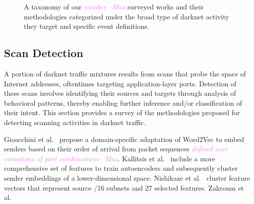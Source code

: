 \documentclass[manuscript,nonacm]{acmart}
\newcommand{\maxnote}[1]{\textit{\textcolor{violet}{#1 --Max}}}
\begin{document}
\begin{figure}
    \caption{A taxonomy of our \maxnote{number} surveyed works and their methodologies categorized under the broad type of darknet activity they target and specific event definitions.}
    \label{fig:taxonomy}
\end{figure}

\subsection{Scan Detection}

A portion of darknet traffic mixtures results from scans that probe the space of Internet addresses, oftentimes targeting application-layer ports.
Detection of these scans involves identifying their sources and targets through analysis of behavioral patterns, thereby enabling further inference and/or classification of their intent.
This section provides a survey of the methodologies proposed for detecting scanning activities in darknet traffic. 

Gioacchini et al.~\cite{2021gioacchini,2023gioacchini} propose a domain-specific adaptation of Word2Vec to embed senders based on their order of arrival from packet sequences \maxnote{defined over variations of port combinations}.
Kallitsis et al.~\cite{2022kallitsis} include a more comprehensive set of features to train autoencoders and subsequently cluster sender embeddings of a lower-dimensional space. 
Nishikaze et al.~\cite{2015nishikaze} cluster feature vectors that represent source /16 subnets and 27 selected features.
Zakroum et al.~\cite{2023zakroum} 
\end{document}
